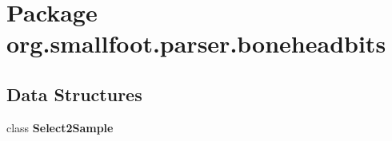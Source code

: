 \section{Package org.\-smallfoot.\-parser.\-boneheadbits}
\label{namespaceorg_1_1smallfoot_1_1parser_1_1boneheadbits}
\subsection*{Data Structures}
\begin{DoxyCompactItemize}
\item 
class {\bf Select2\-Sample}
\end{DoxyCompactItemize}
